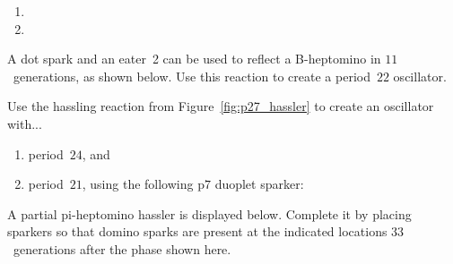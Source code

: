 \begin{multicols}{2}
\begin{problemstar}
\begin{multicols}{2}
\begin{enumerate}
				\item[\bf\color{ocre}(c)] 
				
				\item[\bf\color{ocre}(b)] 
			\end{enumerate}
		\end{multicols}
	\end{problemstar}
	
	
	\mfilbreak
	
	
	\begin{problem}\label{exer:b_heptomino_hassle}
		A dot spark and an eater~2 can be used to reflect a B-heptomino in $11$~generations, as shown below. Use this reaction to create a period~$22$ oscillator.
		\begin{center}
		\end{center}
	\end{problem}
	
	
	\mfilbreak
	
	
	\begin{problem}\label{exer:pond_block_hasslers}
		Use the hassling reaction from Figure~\ref{fig:p27_hassler} to create an oscillator with...
		
		\begin{enumerate}[label=\bf\color{ocre}(\alph*)]
			\item period~$24$, and%
			
			\item period~$21$, using the following p$7$ duoplet sparker:
			
			\begin{center}
			\end{center}
		\end{enumerate}
	\end{problem}


	\mfilbreak
	
	
	\begin{problemstar}\label{exer:p44_pi_hassler} 
		A partial pi-heptomino hassler is displayed below. Complete it by placing sparkers so that domino sparks are present at the indicated locations $33$~generations after the phase shown here.
		

\end{problemstar}
\end{multicols}
